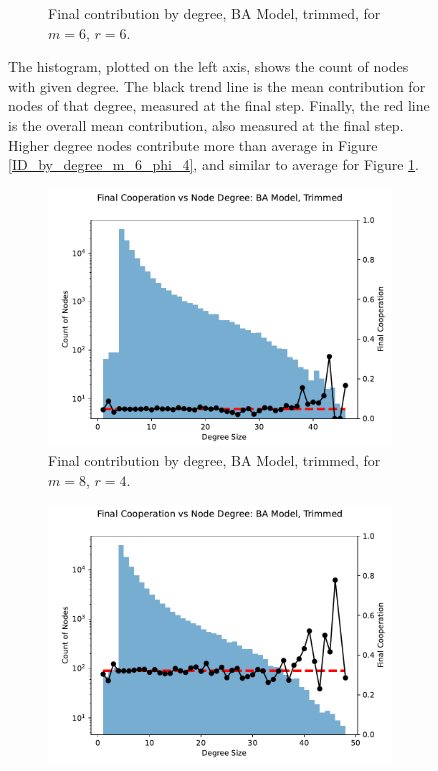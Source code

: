 \begin{figure}[!h]
\begin{subfigure}[b]{0.45\textwidth}
    \caption{Final contribution by degree, BA Model, trimmed, for $m=6$, $r=6$. }
    \label{ID_by_degree_m_6_phi_6}
  \end{subfigure}
  \caption{The histogram, plotted on the left axis, shows the count of nodes with given degree. The black trend line is the mean contribution for nodes of that degree, measured at the final step. Finally, the red line is the overall mean contribution, also measured at the final step. Higher degree nodes contribute more than average in Figure \ref{ID_by_degree_m_6_phi_4}, and similar to average for Figure \ref{ID_by_degree_m_6_phi_6}. } \label{ID_by_degree_m_6}
\end{figure} 
\FloatBarrier


\FloatBarrier 
\begin{figure}[!h]
  \begin{subfigure}[b]{0.45\textwidth}
    \includegraphics[width=1.1\textwidth]{images/Rep_BA_node_groups_m_8_phi_4_trimmed.pdf}
    \caption{Final contribution by degree, BA Model, trimmed, for $m=8$, $r=4$.   }
    \label{ID_by_degree_m_8_phi_4}
  \end{subfigure}
  \hfill
  \begin{subfigure}[b]{0.45\textwidth}
    \includegraphics[width=1.1\textwidth]{images/Rep_BA_node_groups_m_8_phi_6_trimmed.pdf}

\end{subfigure}
\end{figure}
